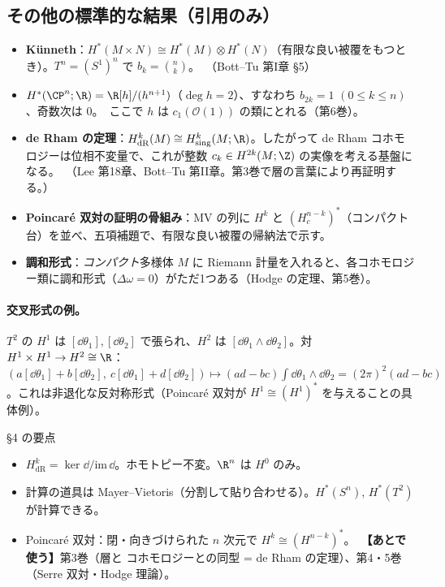 \subsection{その他の標準的な結果（引用のみ）}
\begin{itemize}
\item \textbf{Künneth}：$H^*(M\times N)\cong H^*(M)\otimes H^*(N)$（有限な良い被覆をもつとき）。$T^n=(S^1)^n$ で $b_k=\binom nk$。\tC\ （Bott--Tu 第I章 §5）
\item $H^*(\CP^n;\R)=\R[h]/(h^{n+1})$（$\deg h=2$）、すなわち $b_{2k}=1$ $(0\le k\le n)$、奇数次は $0$。\tC\ ここで $h$ は $c_1(\mathcal O(1))$ の類にとれる（第6巻）。
\item \textbf{de Rham の定理}：$H^k_{\mathrm{dR}}(M)\cong H^k_{\mathrm{sing}}(M;\R)$。したがって de Rham コホモロジーは位相不変量で、これが整数 $c_k\in H^{2k}(M;\Z)$ の実像を考える基盤になる。\tC\ （Lee 第18章、Bott--Tu 第II章。第3巻で層の言葉により再証明する。）
\item \textbf{Poincar\'e 双対の証明の骨組み}：MV の列に $H^k$ と $(H_c^{n-k})^*$（コンパクト台）を並べ、五項補題で、有限な良い被覆の帰納法で示す。\tC
\item \textbf{調和形式}：\emph{コンパクト}多様体 $M$ に Riemann 計量を入れると、各コホモロジー類に調和形式（$\Delta\omega=0$）がただ1つある（Hodge の定理、第5巻）。
\end{itemize}

\paragraph{交叉形式の例。}$T^2$ の $H^1$ は $[\dd\theta_1],[\dd\theta_2]$ で張られ、$H^2$ は $[\dd\theta_1\wedge\dd\theta_2]$。対 $H^1\times H^1\to H^2\cong\R$：$(a[\dd\theta_1]+b[\dd\theta_2],\ c[\dd\theta_1]+d[\dd\theta_2])\mapsto(ad-bc)\int\dd\theta_1\wedge\dd\theta_2=(2\pi)^2(ad-bc)$。これは非退化な反対称形式（Poincar\'e 双対が $H^1\cong(H^1)^*$ を与えることの具体例）。

\begin{keybox}{§4 の要点}
\begin{itemize}
\item $H^k_{\mathrm{dR}}=\ker\dd/\mathrm{im}\,\dd$。ホモトピー不変。$\R^n$ は $H^0$ のみ。
\item 計算の道具は Mayer--Vietoris（分割して貼り合わせる）。$H^*(S^n)$, $H^*(T^2)$ が計算できる。
\item Poincar\'e 双対：閉・向きづけられた $n$ 次元で $H^k\cong(H^{n-k})^*$。\ \textbf{【あとで使う】}第3巻（層と \Cech{} コホモロジーとの同型 = de Rham の定理）、第4・5巻（Serre 双対・Hodge 理論）。
\end{itemize}
\end{keybox}

